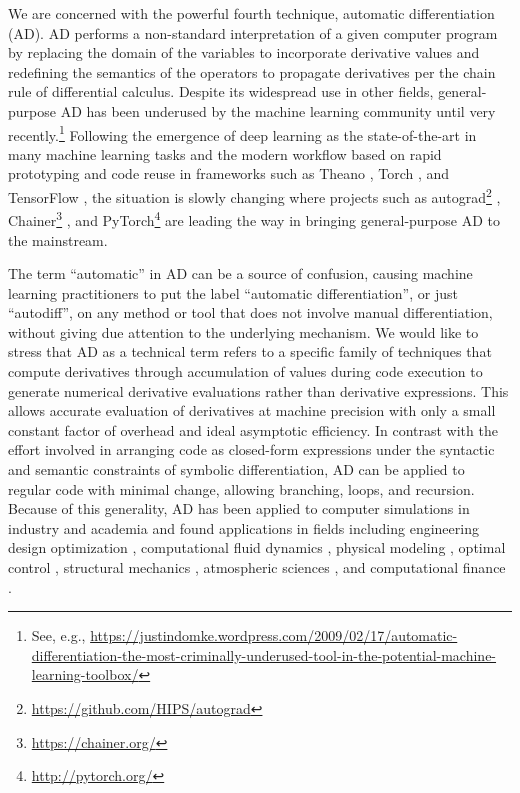 \documentclass[twoside,11pt]{article}
\begin{document}
We are concerned with the powerful fourth technique, automatic differentiation (AD). AD performs a non-standard interpretation of a given computer program by replacing the domain of the variables to incorporate derivative values and redefining the semantics of the operators to propagate derivatives per the chain rule of differential calculus. Despite its widespread use in other fields, general-purpose AD has been underused by the machine learning community until very recently.\footnote{See, e.g., \url{https://justindomke.wordpress.com/2009/02/17/automatic-differentiation-the-most-criminally-underused-tool-in-the-potential-machine-learning-toolbox/}} Following the emergence of deep learning \citep{lecun2015deep,goodfellow2016deep} as the state-of-the-art in many machine learning tasks and the modern workflow based on rapid prototyping and code reuse in frameworks such as Theano \citep{Bastien2012}, Torch \citep{collobert2011torch7}, and TensorFlow \citep{abadi2016tensorflow}, the situation is slowly changing where projects such as autograd\footnote{\url{https://github.com/HIPS/autograd}} \citep{maclaurin2016modeling}, Chainer\footnote{\url{https://chainer.org/}} \citep{tokui2015chainer}, and PyTorch\footnote{\url{http://pytorch.org/}} \citep{paszke2017automatic} are leading the way in bringing general-purpose AD to the mainstream.

The term ``automatic'' in AD can be a source of confusion, causing machine learning practitioners to put the label ``automatic differentiation'', or just ``autodiff'', on any method or tool that does not involve manual differentiation, without giving due attention to the underlying mechanism. We would like to stress that AD as a technical term refers to a specific family of techniques that compute derivatives through accumulation of values during code execution to generate numerical derivative evaluations rather than derivative expressions. This allows accurate evaluation of derivatives at machine precision with only a small constant factor of overhead and ideal asymptotic efficiency. In contrast with the effort involved in arranging code as closed-form expressions under the syntactic and semantic constraints of symbolic differentiation, AD can be applied to regular code with minimal change, allowing branching, loops, and recursion. Because of this generality, AD has been applied to computer simulations in industry and academia and found applications in fields including engineering design optimization \citep{forth2002aerofoil,casanova2002application}, computational fluid dynamics \citep{Muller2005,thomas2006using,Bischof2006}, physical modeling \citep{Ekstrom2010}, optimal control \citep{Walther2007}, structural mechanics \citep{haase2002optimal}, atmospheric sciences \citep{Carmichael1997,Charpentier2000}, and computational finance \citep{Bischof2002,Capriotti2011}.
\end{document}
